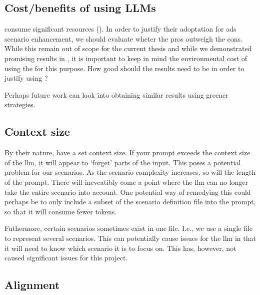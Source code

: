 \subsection{Cost/benefits of using LLMs}

 consume significant resources (). In order to justify their
adoptation for \acrshort{ads} scenario enhancement, we should evaluate wheter the pros outweigh the
cons. While this remain out of scope for the current thesis and while we demonstrated promising
results in , it is important to keep in mind the environmental cost of using the
 for this purpose. How good should the results need to be in order to justify using
?

Perhaps future work can look into obtaining similar results using greener strategies.


\subsection{Context size}

By their nature,  have a set context size. If your prompt exceeds the context size
of the \acrshort{llm}, it will appear to `forget' parts of the input. This poses a potential problem
for our scenarios. As the scenario complexity increases, so will the length of the prompt. There
will ineveatibly come a point where the \acrshort{llm} can no longer take the entire scenario into
account. One potential way of remedying this could perhaps be to only include a subset of the
scenario definition file into the prompt, so that it will consume fewer tokens.

Futhermore, certain scenarios sometimes exist in one file. I.e., we use a single file to represent
several scenarios. This can potentially cause issues for the \acrshort{llm} in that it will need to
know which scenario it is to focus on. This has, however, not caused significant issues for this project.

\subsection{Alignment}

